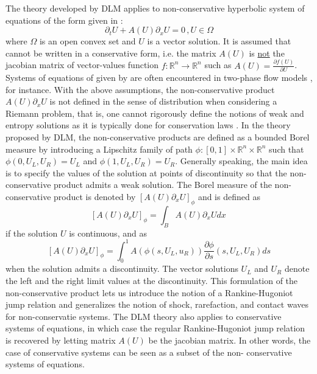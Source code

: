 \documentclass[times]{fldauth}
\begin{document}
The theory developed by DLM \cite{dlm} applies to non-conservative hyperbolic system of equations of the form given in :
%
\begin{equation}\label{eq:nc-syst-eq}
\partial_t U + A(U) \partial_x U = 0 \, , U \in \Omega
\end{equation}
%
where $\Omega$ is an open convex set and $U$ is a vector solution. It is assumed that  cannot be 
written in a conservative form, i.e. the matrix $A(U)$ is \underline{not} the jacobian matrix of vector-values function $f: 
\mathbb{R}^n \to \mathbb{R}^n$ such as $A(U) = \frac{\partial f(U)}{\partial U}$. Systems of equations of given by  
 are often encountered in two-phase flow models \cite{Saurel_2009, Ambroso_2012, Zein_2010, Li_2004, Saurel_2001b, Saurel_2001a, GuillardMurrone2003}, for instance. With the above assumptions, 
the non-conservative product $A(U) \partial_x U$ is not defined in the sense of distribution  when considering 
a Riemann problem, that is, one cannot rigorously define the notions of weak and entropy solutions as it is typically done for 
conservation laws \cite{Lax}. In the theory proposed by DLM, the non-conservative products are defined as a bounded Borel 
measure by introducing a Lipschitz family of path $\phi: [0,1] \times \mathbb{R}^n \times \mathbb{R}^n$ such that 
$\phi(0, U_L, U_R) = U_L$ and $\phi(1, U_L, U_R) = U_R$. Generally speaking, the main idea is to specify the values of the 
solution at points of discontinuity so that the non-conservative product admits a weak solution. The Borel measure of 
the non-conservative product is denoted by $\left[ A(U) \partial_x U \right]_\phi$ and is defined as
%
\begin{equation}
\left[ A(U) \partial_x U \right]_\phi = \int_B A(U) \partial_x U dx \, 
\end{equation}
%
if the solution $U$ is continuous, and as
%
\begin{equation}
\left[ A(U) \partial_x U \right]_\phi = \int_0^1 A(\phi(s,U_L,u_R)) \frac{\partial \phi}{\partial s}(s, U_L, U_R)ds 
\end{equation}
%
when the solution admits a discontinuity. The vector solutions $U_L$ and $U_R$ denote the left and the right limit values at the discontinuity. This formulation of the non-conservative product lets us introduce the notion 
of a Rankine-Hugoniot jump relation and generalizes the notion of shock, rarefaction, and contact waves 
for non-conservatie systems. The DLM theory also applies to conservative systems of 
equations, in which case the regular Rankine-Hugoniot jump relation is recovered by letting matrix $A(U)$ be the
jacobian matrix. In other words, the case of conservative systems can be seen as a subset of the non-
conservative systems of equations. 
\end{document}
